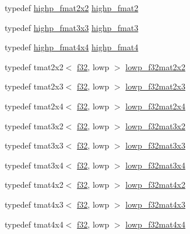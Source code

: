 \begin{DoxyCompactItemize}
\item 
typedef \hyperlink{namespaceglm_a1497c01f2be9db9d69144537e00ff695}{highp\+\_\+fmat2x2} \hyperlink{namespaceglm_a10d47be18a81c111a8706d0a6df5b4ea}{highp\+\_\+fmat2}
\item 
typedef \hyperlink{namespaceglm_a3390aa5d7faf93394576070f3bd2c1e7}{highp\+\_\+fmat3x3} \hyperlink{namespaceglm_a3ff9af2eba26aa6df92aa73e1083e81e}{highp\+\_\+fmat3}
\item 
typedef \hyperlink{namespaceglm_a57e1bf855a227322e9a9809f03c7f111}{highp\+\_\+fmat4x4} \hyperlink{namespaceglm_a4c7c9823ade7c29e29b5a313949ae502}{highp\+\_\+fmat4}
\item 
typedef tmat2x2$<$ \hyperlink{group__gtc__type__precision_ga0ec999b57f5330d9021256e96038df04}{f32}, lowp $>$ \hyperlink{namespaceglm_ab9e4eb16dafb8cb18d411490d8ccc611}{lowp\+\_\+f32mat2x2}
\item 
typedef tmat2x3$<$ \hyperlink{group__gtc__type__precision_ga0ec999b57f5330d9021256e96038df04}{f32}, lowp $>$ \hyperlink{namespaceglm_a952a42800932ee1d55415c1045f041fd}{lowp\+\_\+f32mat2x3}
\item 
typedef tmat2x4$<$ \hyperlink{group__gtc__type__precision_ga0ec999b57f5330d9021256e96038df04}{f32}, lowp $>$ \hyperlink{namespaceglm_a61927ceea97a94ec30f22de589342891}{lowp\+\_\+f32mat2x4}
\item 
typedef tmat3x2$<$ \hyperlink{group__gtc__type__precision_ga0ec999b57f5330d9021256e96038df04}{f32}, lowp $>$ \hyperlink{namespaceglm_a7ab718e123585d94f76770315cc37967}{lowp\+\_\+f32mat3x2}
\item 
typedef tmat3x3$<$ \hyperlink{group__gtc__type__precision_ga0ec999b57f5330d9021256e96038df04}{f32}, lowp $>$ \hyperlink{namespaceglm_ab7d83082e77b2817c3dfcdcd9c432329}{lowp\+\_\+f32mat3x3}
\item 
typedef tmat3x4$<$ \hyperlink{group__gtc__type__precision_ga0ec999b57f5330d9021256e96038df04}{f32}, lowp $>$ \hyperlink{namespaceglm_a5102fa6a00423f045c058f77d8158bdd}{lowp\+\_\+f32mat3x4}
\item 
typedef tmat4x2$<$ \hyperlink{group__gtc__type__precision_ga0ec999b57f5330d9021256e96038df04}{f32}, lowp $>$ \hyperlink{namespaceglm_aa1fa9f01c5151ed5332a046dc87e4356}{lowp\+\_\+f32mat4x2}
\item 
typedef tmat4x3$<$ \hyperlink{group__gtc__type__precision_ga0ec999b57f5330d9021256e96038df04}{f32}, lowp $>$ \hyperlink{namespaceglm_ac2931d0b3712162304ec7f26ba4db4d4}{lowp\+\_\+f32mat4x3}
\item 
typedef tmat4x4$<$ \hyperlink{group__gtc__type__precision_ga0ec999b57f5330d9021256e96038df04}{f32}, lowp $>$ \hyperlink{namespaceglm_a2cb18a3aae9d4e53dbae4554089cc056}{lowp\+\_\+f32mat4x4}

\end{DoxyCompactItemize}
